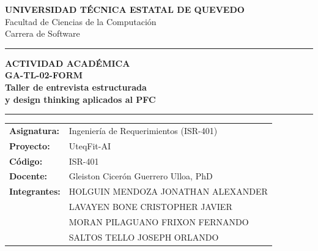 \documentclass[11pt,a4paper]{article}
\begin{document}
\begin{titlepage}
		\centering

		{\large\textbf{UNIVERSIDAD TÉCNICA ESTATAL DE QUEVEDO}}\\[0.3cm]

		{\normalsize Facultad de Ciencias de la Computación}\\[0.15cm]
		{\normalsize Carrera de Software}

		\vspace{1.5cm}

		{\color{azulTabla}\rule{0.85\textwidth}{1.5pt}}

		\vspace{1.2cm}

		{\large\textcolor{azulTabla}{\textbf{ACTIVIDAD ACADÉMICA}}}\\[0.5cm]

		{\Large\textbf{GA-TL-02-FORM}}\\[0.8cm]

		{\LARGE\bfseries
			Taller de entrevista estructurada\\[0.2cm]
			y design thinking aplicados al PFC
		}

		\vspace{1.2cm}

		{\color{azulTabla}\rule{0.85\textwidth}{1.5pt}}

		\vspace{0.8cm}

		\begin{minipage}{0.85\textwidth}
			\renewcommand{\arraystretch}{1.7}

			\begin{tabular}{@{}>{\bfseries}p{3.2cm}p{9cm}@{}}

				Asignatura: &
				Ingeniería de Requerimientos (ISR-401) \\

				Proyecto: & UteqFit-AI \\

				Código: &
				ISR-401 \\

				Docente: &
				Gleiston Cicerón Guerrero Ulloa, PhD \\

				Integrantes: & HOLGUIN MENDOZA JONATHAN ALEXANDER \\
				& LAVAYEN BONE CRISTOPHER JAVIER \\
				& MORAN PILAGUANO FRIXON FERNANDO \\
				& SALTOS TELLO JOSEPH ORLANDO \\



\end{tabular}
\end{minipage}
\end{titlepage}
\end{document}
